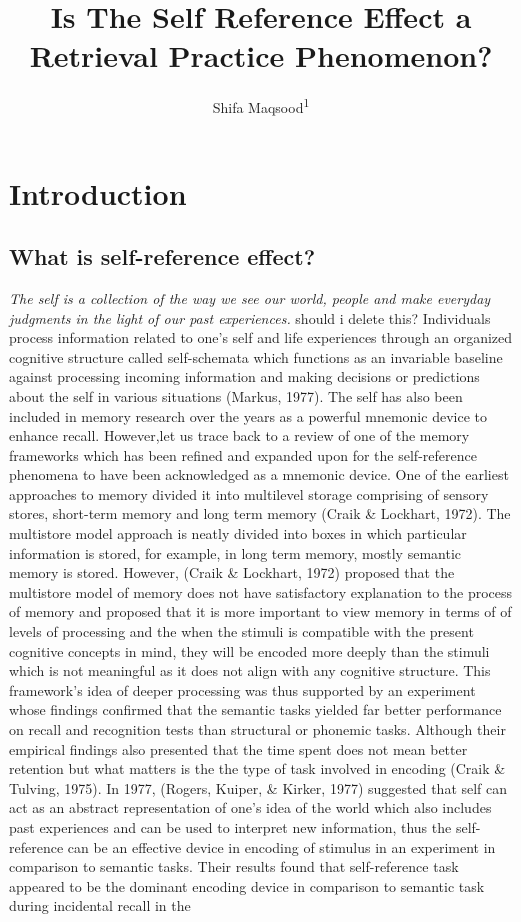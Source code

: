 \documentclass[
  man,floatsintext]{apa6}
\title{Is The Self Reference Effect a Retrieval Practice Phenomenon?}
\author{Shifa Maqsood\textsuperscript{1}}
\date{}
\affiliation{\vspace{0.5cm}\textsuperscript{1} Brooklyn College of CUNY}
\begin{document}
\maketitle

\hypertarget{introduction}{%
\section{Introduction}\label{introduction}}

\hypertarget{what-is-self-reference-effect}{%
\subsection{What is self-reference effect?}\label{what-is-self-reference-effect}}

\emph{The self is a collection of the way we see our world, people and make everyday judgments in the light of our past experiences.} should i delete this? Individuals process information related to one's self and life experiences through an organized cognitive structure called self-schemata which functions as an invariable baseline against processing incoming information and making decisions or predictions about the self in various situations (Markus, 1977). The self has also been included in memory research over the years as a powerful mnemonic device to enhance recall. However,let us trace back to a review of one of the memory frameworks which has been refined and expanded upon for the self-reference phenomena to have been acknowledged as a mnemonic device. One of the earliest approaches to memory divided it into multilevel storage comprising of sensory stores, short-term memory and long term memory (Craik \& Lockhart, 1972). The multistore model approach is neatly divided into boxes in which particular information is stored, for example, in long term memory, mostly semantic memory is stored. However, (Craik \& Lockhart, 1972) proposed that the multistore model of memory does not have satisfactory explanation to the process of memory and proposed that it is more important to view memory in terms of of levels of processing and the when the stimuli is compatible with the present cognitive concepts in mind, they will be encoded more deeply than the stimuli which is not meaningful as it does not align with any cognitive structure. This framework's idea of deeper processing was thus supported by an experiment whose findings confirmed that the semantic tasks yielded far better performance on recall and recognition tests than structural or phonemic tasks. Although their empirical findings also presented that the time spent does not mean better retention but what matters is the the type of task involved in encoding (Craik \& Tulving, 1975). In 1977, (Rogers, Kuiper, \& Kirker, 1977) suggested that self can act as an abstract representation of one's idea of the world which also includes past experiences and can be used to interpret new information, thus the self-reference can be an effective device in encoding of stimulus in an experiment in comparison to semantic tasks. Their results found that self-reference task appeared to be the dominant encoding device in comparison to semantic task during incidental recall in the 
\end{document}
